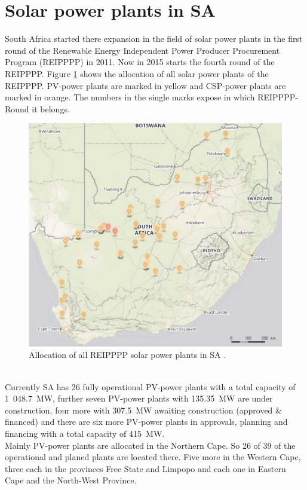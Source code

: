 \documentclass[Master,MEE,english]{twbook}%
\begin{document}
\section{Solar power plants in SA}
South Africa started there expansion in the field of solar power plants in the first round of the Renewable Energy Independent Power Producer Procurement Program (REIPPPP) in 2011. Now in 2015 starts the fourth round of the REIPPPP. Figure \ref{Solar-map} shows the allocation of all solar power plants of the REIPPPP. PV-power plants are marked in yellow and CSP-power plants are marked in orange. The numbers in the single marks expose in which REIPPPP-Round it belongs.
\begin{figure}[h!] %
\centering
\includegraphics[width=1\linewidth]{FIG/Solar-map}
\caption[Allocation of all REIPPPP solar power plants in SA.]{Allocation of all REIPPPP solar power plants in SA \cite{Forder2015}.}\label{Solar-map}
\end{figure}\\
Currently SA has 26 fully operational PV-power plants with a total capacity of 1~048.7~MW, further seven PV-power plants with 135.35~MW are under construction, four more with 307.5~MW awaiting construction (approved \& financed) and there are six more PV-power plants in approvals, planning and financing with a total capacity of 415~MW. \\
Mainly PV-power plants are allocated in the Northern Cape. So 26 of 39 of the operational and planed plants are located there. Five more in the Western Cape, three each in the provinces Free State and Limpopo and each one in Eastern Cape and the North-West Province. \cite{Forder2015}\\
\end{document}
